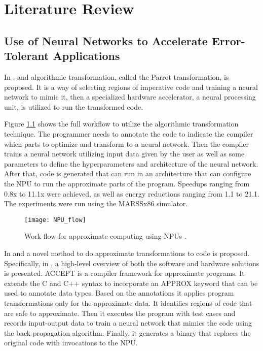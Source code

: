 \chapter{Literature Review}
\label{ch:review}

\section{Use of Neural Networks to Accelerate Error-\\Tolerant Applications}

In \cite{Esmaeilzadeh2012}, and algorithmic transformation, called the Parrot transformation, is proposed. It is a way of selecting regions of imperative code and training a neural network to mimic it, then a specialized hardware accelerator, a neural processing unit, is utilized to run the transformed code.

Figure \ref{fig:NPU_flow} shows the full workflow to utilize the algorithmic transformation technique. The programmer needs to annotate the code to indicate the compiler which parts to optimize and transform to a neural network. Then the compiler trains a neural network utilizing input data given by the user as well as some parameters to define the hyperparameters and architecture of the neural network. After that, code is generated that can run in an architecture that can configure the NPU to run the approximate parts of the program. Speedups ranging from 0.8x to 11.1x were achieved, as well as energy reductions ranging from 1.1 to 21.1. The experiments were run using the MARSSx86 simulator.

\begin{figure}[thbp]
	\centering
	\texttt{[image: NPU\_flow]}
	\caption[Work flow for approximate computing using NPUs.]{Work flow for approximate computing using NPUs \cite{Esmaeilzadeh2012}.}
	\label{fig:NPU_flow}
\end{figure}

In \cite{Moreau2015a} and \cite{Moreau2015} a novel method to do approximate transformations to code is proposed. Specifically, in \cite{Moreau2015a}, a high-level overview of both the software and hardware solutions is presented. ACCEPT is a compiler framework for approximate programs. It extends the C and C++ syntax to incorporate an APPROX keyword that can be used to annotate data types. Based on the annotations it applies program transformations only for the approximate data. It identifies regions of code that are safe to approximate. Then it executes the program with test cases and records input-output data to train a neural network that mimics the code using the back-propagation algorithm. Finally, it generates a binary that replaces the original code with invocations to the NPU.

